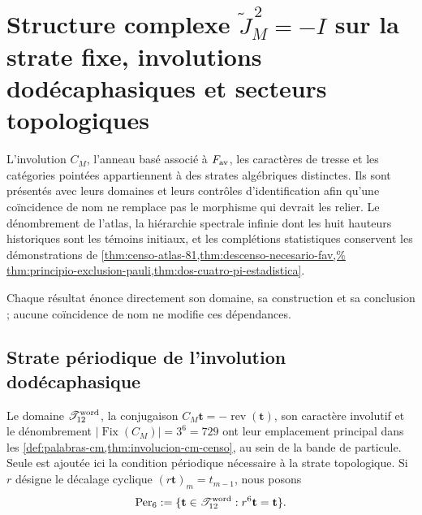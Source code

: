 \chapter[Structure complexe \texorpdfstring{\(\widetilde J_M^{\,2}=-I\)}{J M au carré = -I} et secteurs topologiques]
{Structure complexe \texorpdfstring{\(\widetilde J_M^{\,2}=-I\)}{J M au carré = -I} sur la strate fixe, involutions dodécaphasiques et secteurs topologiques}
\label{chap:sectores-topologicos-no-omision}

L’involution \(C_M\), l’anneau basé associé à \(F_{\rm av}\), les caractères de tresse et les catégories pointées appartiennent à des strates algébriques distinctes. Ils sont présentés avec leurs domaines et leurs contrôles d’identification afin qu’une coïncidence de nom ne remplace pas le morphisme qui devrait les relier. Le dénombrement de l’atlas, la hiérarchie spectrale infinie dont les huit hauteurs historiques sont les témoins initiaux, et les complétions statistiques conservent les démonstrations de \cref{thm:censo-atlas-81,thm:descenso-necesario-fav,%
thm:principio-exclusion-pauli,thm:dos-cuatro-pi-estadistica}.

Chaque résultat énonce directement son domaine, sa construction et sa conclusion ; aucune coïncidence de nom ne modifie ces dépendances.

\section{Strate périodique de l’involution dodécaphasique}
\label{sec:involucion-cm-censo}

Le domaine \(\mathscr T_{12}^{\rm word}\), la conjugaison \(C_M\mathbf t=-\operatorname{rev}(\mathbf t)\), son caractère involutif et le dénombrement \(\lvert\operatorname{Fix}(C_M)\rvert=3^6=729\) ont leur emplacement principal dans les \cref{def:palabras-cm,thm:involucion-cm-censo}, au sein de la bande de particule. Seule est ajoutée ici la condition périodique nécessaire à la strate topologique. Si \(r\) désigne le décalage cyclique \((r\mathbf t)_m=t_{m-1}\), nous posons
\[
 \operatorname{Per}_6
 :=\{\mathbf t\in\mathscr T_{12}^{\rm word}:r^6\mathbf t=\mathbf t\}.
\]

